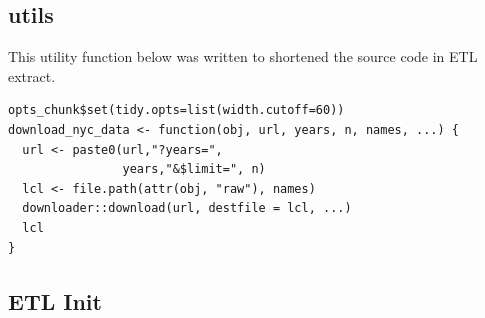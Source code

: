 \documentclass[12pt,twoside]{reedthesis}
\theoremstyle{definition}
\theoremstyle{definition}
\theoremstyle{definition}
\theoremstyle{remark}
\begin{document}
\subsection{utils}\label{utils}

This utility function below was written to shortened the source code in
ETL extract.
\begin{verbatim}
opts_chunk$set(tidy.opts=list(width.cutoff=60))
download_nyc_data <- function(obj, url, years, n, names, ...) {
  url <- paste0(url,"?years=",
                years,"&$limit=", n)
  lcl <- file.path(attr(obj, "raw"), names)
  downloader::download(url, destfile = lcl, ...)
  lcl
}
\end{verbatim}
\subsection{ETL Init}\label{etl-init}
\end{document}
